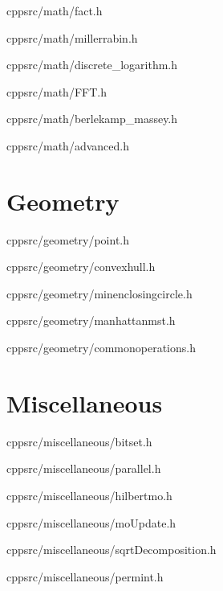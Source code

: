 \documentclass[portrait, 8pt, a4paper, oneside, twocolumn]{extarticle}
\begin{document}
    {}
    {}
    {cpp}{src/math/fact.h}
    \noindent\hrulefill


    {}
    {}
    {cpp}{src/math/millerrabin.h}
    \noindent\hrulefill

    {}
    {}
    {cpp}{src/math/discrete_logarithm.h}
    \noindent\hrulefill

    {}
    {}
    {cpp}{src/math/FFT.h}
    \noindent\hrulefill
    
    {}
    {}
    {cpp}{src/math/berlekamp_massey.h}
    \noindent\hrulefill

	{}
	{}
	{cpp}{src/math/advanced.h}
	\noindent\hrulefill
\section{Geometry}

    {}
    {}
    {cpp}{src/geometry/point.h}
    \noindent\hrulefill

    {}
    {}
    {cpp}{src/geometry/convexhull.h}
    \noindent\hrulefill

    {}
    {}
    {cpp}{src/geometry/minenclosingcircle.h}
    \noindent\hrulefill

    {}
    {}
    {cpp}{src/geometry/manhattanmst.h}
    \noindent\hrulefill

    {}
    {}
    {cpp}{src/geometry/commonoperations.h}
    \noindent\hrulefill

\section{Miscellaneous}
	{}
	{}
	{cpp}{src/miscellaneous/bitset.h}
	\noindent\hrulefill
    
	{}
	{}
	{cpp}{src/miscellaneous/parallel.h}
	\noindent\hrulefill
    
    {}
    {}
    {cpp}{src/miscellaneous/hilbertmo.h}
    \noindent\hrulefill

    {}
    {}
    {cpp}{src/miscellaneous/moUpdate.h}
    \noindent\hrulefill

    {}
    {}
    {cpp}{src/miscellaneous/sqrtDecomposition.h}
    \noindent\hrulefill

    {}
    {}
    {cpp}{src/miscellaneous/permint.h}
    \noindent\hrulefill


\end{document}

